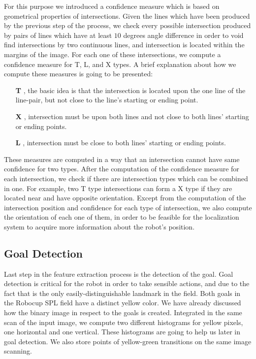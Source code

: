 \documentclass[	DIV=calc,%
							paper=a4,%
							fontsize=9pt,%
							twocolumn]{scrartcl}	 					%
\begin{document}
For this purpose we introduced a confidence measure which is based on geometrical properties of intersections. Given the lines which have been produced by the previous step of the process, we check every possible intersection produced by pairs of lines which have at least $10$ degrees angle difference in order to void find intersections by two continuous lines, and intersection is located within the margins of the image. For each one of these intersections, we compute a confidence measure for T, L, and X types. A brief explanation about how we compute these measures is going to be presented:
\begin{itemize}
\item[\textbf{T}]{, the basic idea is that the intersection is located upon the one line of the line-pair, but not close to the line's starting or ending point.}
\item[\textbf{X}]{, intersection must be upon both lines and not close to both lines' starting or ending points. }
\item[\textbf{L}]{, intersection must be close to both lines' starting or ending points.}
\end{itemize}
These measures are computed in a way that an intersection cannot have same confidence for two types. After the computation of the confidence measure for each intersection, we check if there are intersection types which can be combined in one. For example, two T type intersections can form a X type if they are located near and have opposite orientation. Except from the computation of the intersection position and confidence for each type of intersection, we also compute the orientation of each one of them, in order to be feasible for the localization system to acquire more information about the robot's position.

\subsection{Goal Detection}
Last step in the feature extraction process is the detection of the goal. Goal detection is critical for the robot in order to take sensible actions, and due to the fact that is the only easily-distinguishable landmark in the field. Both goals in the Robocup SPL field have a distinct yellow color. We have already discussed how the binary image in respect to the goals is created. Integrated in the same scan of the input image, we compute two different histograms for yellow pixels, one horizontal and one vertical. These histograms are going to help us later in goal detection. We also store points of yellow-green transitions on the same image scanning.
\end{document}
